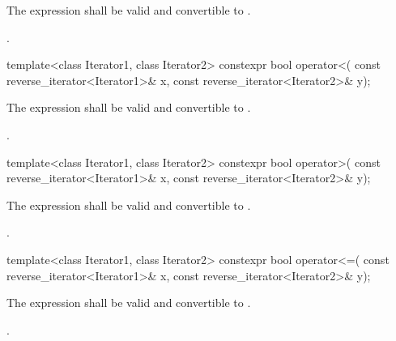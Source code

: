 \begin{itemdescr}
{\color{newclr}
\pnum
\constraints
The expression  shall be valid and
convertible to .
} %

\pnum
\returns
{}.
\end{itemdescr}

%
\begin{itemdecl}
template<class Iterator1, class Iterator2>
  constexpr bool operator<(
    const reverse_iterator<Iterator1>& x,
    const reverse_iterator<Iterator2>& y);
\end{itemdecl}

\begin{itemdescr}
{\color{newclr}
\pnum
\constraints
The expression  shall be valid and
convertible to .
} %

\pnum
\returns
{}.
\end{itemdescr}

%
\begin{itemdecl}
template<class Iterator1, class Iterator2>
  constexpr bool operator>(
    const reverse_iterator<Iterator1>& x,
    const reverse_iterator<Iterator2>& y);
\end{itemdecl}

\begin{itemdescr}
{\color{newclr}
\pnum
\constraints
The expression  shall be valid and
convertible to .
} %

\pnum
\returns
{}.
\end{itemdescr}

%
\begin{itemdecl}
template<class Iterator1, class Iterator2>
  constexpr bool operator<=(
    const reverse_iterator<Iterator1>& x,
    const reverse_iterator<Iterator2>& y);
\end{itemdecl}

\begin{itemdescr}
{\color{newclr}
\pnum
\constraints
The expression  shall be valid and
convertible to .
} %

\pnum
\returns
{}.
\end{itemdescr}

